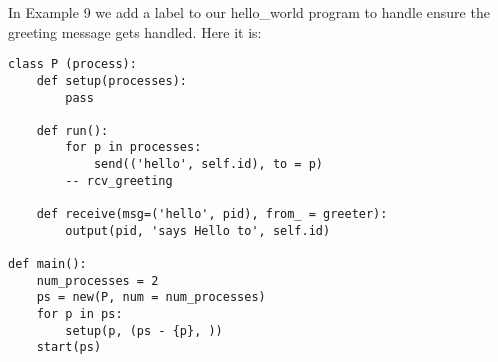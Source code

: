 \documentclass[11pt]{article}
\begin{document}
In Example 9 we add a label to our hello_world program to handle ensure the
greeting message gets handled. Here it is:
\begin{lstlisting}[caption={hello\_world09.da - Yield Points}, label={lst:hw09}]
class P (process):
    def setup(processes):
        pass

    def run():
        for p in processes:
            send(('hello', self.id), to = p)
        -- rcv_greeting

    def receive(msg=('hello', pid), from_ = greeter):
        output(pid, 'says Hello to', self.id)
        
def main():
    num_processes = 2
    ps = new(P, num = num_processes)
    for p in ps:
        setup(p, (ps - {p}, ))
    start(ps)
\end{lstlisting}
\end{document}
